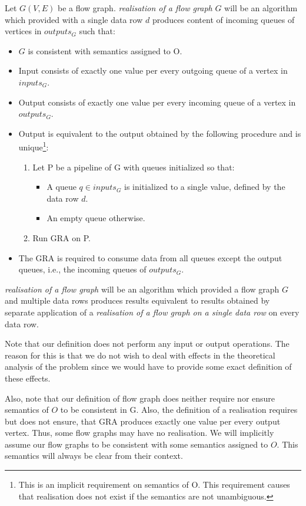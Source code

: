   Let $G(V,E)$ be a flow graph. \emph{realisation of a flow graph} $G$ will be an algorithm which provided with a single data row $d$ produces content of incoming queues of vertices in $outputs_G$ such that: 
  \begin{itemize}
    \item $G$ is consistent with semantics assigned to O.
    \item Input consists of exactly one value per every outgoing queue of a vertex in $inputs_G$.
    \item Output consists of exactly one value per every incoming queue of a vertex in $outputs_G$.
    \item Output is equivalent to the output obtained by the following procedure and is unique\footnote{This is an implicit requirement on semantics of O. This requirement causes that realisation does not exist if the semantics are not unambiguous.}:
    \begin{enumerate}
      \item Let P be a pipeline of G with queues initialized so that:
      \begin{itemize}
        \item A queue $q \in inputs_G$ is initialized to a single value, defined by the data row $d$.
        \item An empty queue otherwise.
      \end{itemize}
      \item Run GRA on P.
    \end{enumerate}
    \item The GRA is required to consume data from all queues except the output queues, i.e., the incoming queues of $outputs_G$.
  \end{itemize}
\myenddef


  \emph{realisation of a flow graph} will be an algorithm which provided a flow graph $G$ and multiple data rows produces results equivalent to results obtained by separate application of a \emph{realisation of a flow graph on a single data row} on every data row.
\myenddef


Note that our definition does not perform any input or output operations. The reason for this is that we do not wish to deal with effects in the theoretical analysis of the problem since we would have to provide some exact definition of these effects.


Also, note that our definition of flow graph does neither require nor ensure semantics of $O$ to be consistent in G. Also, the definition of a realisation requires but does not ensure, that GRA produces exactly one value per every output vertex. Thus, some flow graphs may have no realisation. We will implicitly assume our flow graphs to be consistent with some semantics assigned to $O$. This semantics will always be clear from their context.


